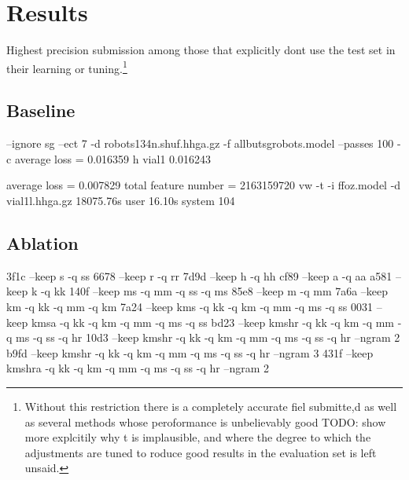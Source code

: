 \documentclass{article}
\begin{document}
\section{Results}

Highest precision submission among those that explicitly dont use the test set in their learning or tuning.\footnote{ Without this restriction there is a completely accurate fiel submitte,d as well as several methods whose peroformance is unbelievably good TODO: show more explcitily why t is implausible, and where the degree to which the adjustments are tuned to roduce good results in the evaluation set is left unsaid.}

\subsection{Baseline}
 
 --ignore sg --ect 7 -d robots134n.shuf.hhga.gz -f allbutsgrobots.model --passes 100 -c
 average loss = 0.016359 h                       
vial1 0.016243

average loss = 0.007829
total feature number = 2163159720
vw -t -i ffoz.model -d vial1l.hhga.gz  18075.76s user 16.10s system 104%



\subsection{Ablation}
% 
3f1c --keep s -q ss
6678 --keep r -q rr
7d9d --keep h -q hh
cf89 --keep a -q aa
a581 --keep k -q kk
140f --keep ms -q mm -q ss -q ms
85e8 --keep m -q mm
7a6a --keep km -q kk -q mm -q km
7a24 --keep kms -q kk -q km -q mm -q ms -q ss
0031 --keep kmsa -q kk -q km -q mm -q ms -q ss
bd23 --keep kmshr -q kk -q km -q mm -q ms -q ss -q hr
10d3 --keep kmshr -q kk -q km -q mm -q ms -q ss -q hr --ngram 2
b9fd --keep kmshr -q kk -q km -q mm -q ms -q ss -q hr --ngram 3
431f --keep kmshra -q kk -q km -q mm -q ms -q ss -q hr --ngram 2
\end{document}
